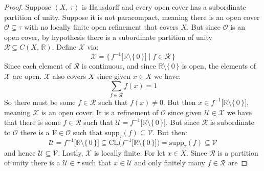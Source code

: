 \documentclass{article}
\theoremstyle{plain}
\theoremstyle{normal}
\begin{document}
        \begin{proof}
            \label{thm:paracompact_has_part_of_unity}%
            Suppose $(X,\,\tau)$ is Hausdorff and every open cover has a
            subordinate partition of unity. Suppose it is not paracompact,
            meaning there is an open cover $\mathcal{O}\subseteq\tau$ with no
            locally finite open refinement that covers $X$. But since
            $\mathcal{O}$ is an open cover, by hypothesis there is a
            subordinate partition of unity
            $\mathcal{R}\subseteq{C}(X,\,\mathbb{R})$. Define $\mathcal{X}$ via:
            \begin{equation}
                \mathcal{X}=
                \big\{\,f^{-1}\big[\mathbb{R}\setminus\{\,0\,\}\big]
                    \;|\;f\in\mathcal{R}\,\}
            \end{equation}
            Since each element of $\mathcal{R}$ is continuous, and since
            $\mathbb{R}\setminus\{\,0\,\}$ is open, the elements of
            $\mathcal{X}$ are open. $\mathcal{X}$ also covers $X$ since given
            $x\in{X}$ we have:
            \begin{equation}
                \sum_{f\in\mathcal{R}}f(x)=1
            \end{equation}
            So there must be some $f\in\mathcal{R}$ such that $f(x)\ne{0}$. But
            then $x\in{f}^{-1}\big[\mathbb{R}\setminus\{\,0\,\}\big]$, meaning
            $\mathcal{X}$ is an open cover. It is a refinement of $\mathcal{O}$
            since given $\mathcal{U}\in\mathcal{X}$ we have that there is some
            $f\in\mathcal{R}$ such that
            $\mathcal{U}=f^{-1}\big[\mathbb{R}\setminus\{\,0\,\}\big]$. But
            since $\mathcal{R}$ is subordinate to $\mathcal{O}$ there is a
            $\mathcal{V}\in\mathcal{O}$ such that
            $\textrm{supp}_{\tau}(f)\subseteq\mathcal{V}$. But then:
            \begin{equation}
                \mathcal{U}=f^{-1}\big[\mathbb{R}\setminus\{\,0\,\}\big]
                \subseteq\textrm{Cl}_{\tau}\Big(
                    f^{-1}\big[\mathbb{R}\setminus\{\,0\,\}\big]\Big)
                =\textrm{supp}_{\tau}(f)
                \subseteq\mathcal{V}
            \end{equation}
            and hence $\mathcal{U}\subseteq\mathcal{V}$. Lastly, $\mathcal{X}$
            is locally finite. For let $x\in{X}$. Since $\mathcal{R}$ is a
            partition of unity there is a $\mathcal{U}\in\tau$ such that
            $x\in\mathcal{U}$ and only finitely many $f\in\mathcal{R}$ are

\end{proof}
\end{document}
